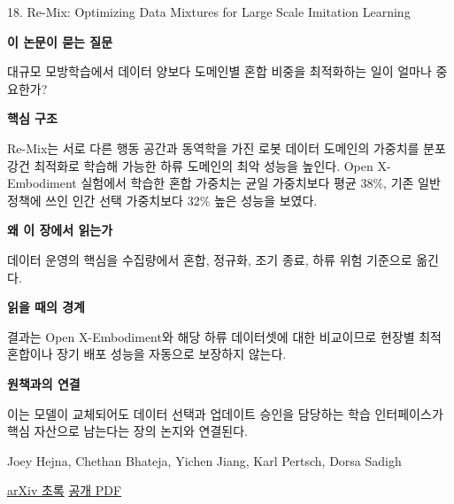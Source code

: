 \documentclass[11pt,openany]{book}
\begin{document}
\begin{termcard}{18. Re-Mix: Optimizing Data Mixtures for Large Scale Imitation Learning}

\par

\medskip

{\sffamily\bfseries\color{deepblue} 이 논문이 묻는 질문}\par

대규모 모방학습에서 데이터 양보다 도메인별 혼합 비중을 최적화하는 일이 얼마나 중요한가?

\smallskip

{\sffamily\bfseries\color{deepblue} 핵심 구조}\par

Re-Mix는 서로 다른 행동 공간과 동역학을 가진 로봇 데이터 도메인의 가중치를 분포 강건 최적화로 학습해 가능한 하류 도메인의 최악 성능을 높인다. Open X-Embodiment 실험에서 학습한 혼합 가중치는 균일 가중치보다 평균 38\%, 기존 일반 정책에 쓰인 인간 선택 가중치보다 32\% 높은 성능을 보였다.

\smallskip

{\sffamily\bfseries\color{deepblue} 왜 이 장에서 읽는가}\par

데이터 운영의 핵심을 수집량에서 혼합, 정규화, 조기 종료, 하류 위험 기준으로 옮긴다.

\smallskip

{\sffamily\bfseries\color{coral} 읽을 때의 경계}\par

결과는 Open X-Embodiment와 해당 하류 데이터셋에 대한 비교이므로 현장별 최적 혼합이나 장기 배포 성능을 자동으로 보장하지 않는다.

\smallskip

{\sffamily\bfseries\color{teal} 원책과의 연결}\par

이는 모델이 교체되어도 데이터 선택과 업데이트 승인을 담당하는 학습 인터페이스가 핵심 자산으로 남는다는 장의 논지와 연결된다.

\medskip

{\footnotesize\color{muted} Joey Hejna, Chethan Bhateja, Yichen Jiang, Karl Pertsch, Dorsa Sadigh\par

\href{https://arxiv.org/abs/2408.14037}{arXiv 초록} \quad \href{https://arxiv.org/pdf/2408.14037}{공개 PDF}\par}

\end{termcard}
\end{document}
